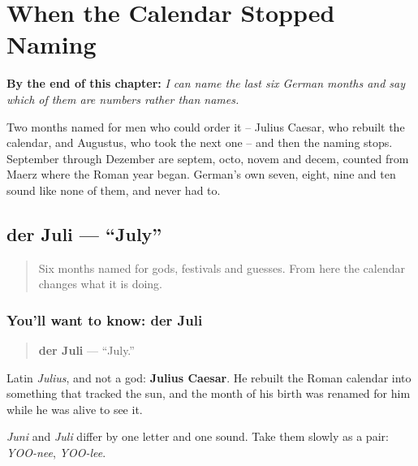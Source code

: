 
\chapter{When the Calendar Stopped Naming}
\label{ch:monate-zahlen}

\begin{chapteropening}
\textbf{By the end of this chapter:} \emph{I can name the last six German months and say which of them are numbers rather than names.}

Two months named for men who could order it -- Julius Caesar, who rebuilt the calendar, and Augustus, who took the next one -- and then the naming stops. September through Dezember are septem, octo, novem and decem, counted from Maerz where the Roman year began. German's own seven, eight, nine and ten sound like none of them, and never had to.
\end{chapteropening}

\section[der Juli]{der Juli — \textquotedblleft{}July\textquotedblright{}}

\label{lesson:GE-C09-juli}



\begin{quote}
Six months named for gods, festivals and guesses. From here the calendar changes what it is doing.
\end{quote}

\subsection*{You'll want to know: der Juli}
\begin{quote}
\textbf{der Juli} — \textquotedblleft{}July.\textquotedblright{}
\end{quote}

Latin \emph{Julius}, and not a god: \textbf{Julius Caesar}. He rebuilt the Roman calendar into something that tracked the sun, and the month of his birth was renamed for him while he was alive to see it.

\emph{Juni} and \emph{Juli} differ by one letter and one sound. Take them slowly as a pair: \emph{YOO-nee}, \emph{YOO-lee}.


